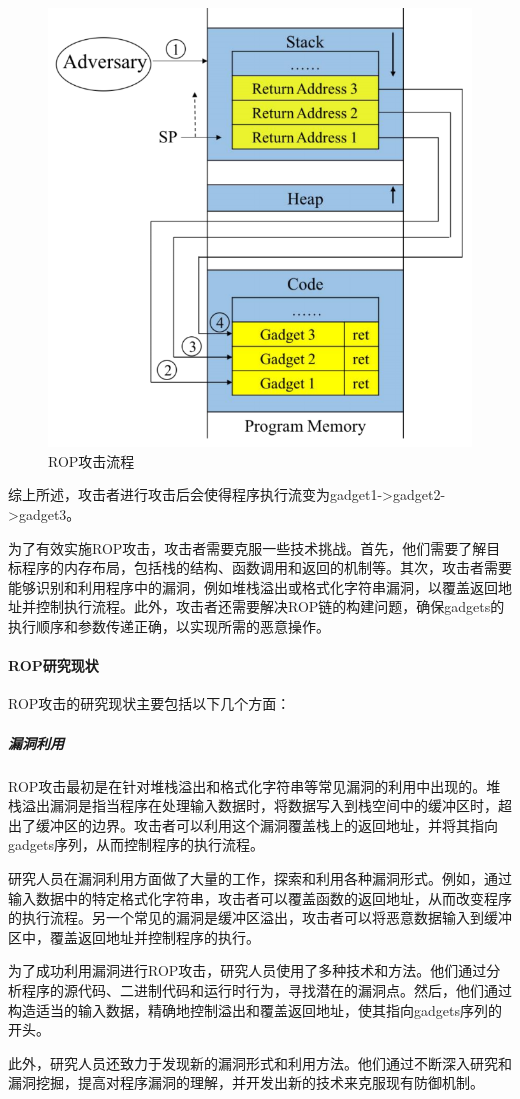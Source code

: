 \documentclass[12pt,a4paper]{ctexart}
\numberwithin{figure}{section}
\begin{document}
\begin{figure}
    \centering
    \includegraphics[scale=0.35]{graph/ROP.png}
    \caption{ROP攻击流程}
    \label{ROP}
\end{figure}
综上所述，攻击者进行攻击后会使得程序执行流变为gadget1->gadget2->gadget3。

\par 为了有效实施ROP攻击，攻击者需要克服一些技术挑战。首先，他们需要了解目标程序的内存布局，包括栈的结构、函数调用和返回的机制等。其次，攻击者需要能够识别和利用程序中的漏洞，例如堆栈溢出或格式化字符串漏洞，以覆盖返回地址并控制执行流程。此外，攻击者还需要解决ROP链的构建问题，确保gadgets的执行顺序和参数传递正确，以实现所需的恶意操作。

\paragraph{ROP研究现状}
ROP攻击的研究现状主要包括以下几个方面：
\subparagraph{漏洞利用}
\par ROP攻击最初是在针对堆栈溢出和格式化字符串等常见漏洞的利用中出现的。堆栈溢出漏洞是指当程序在处理输入数据时，将数据写入到栈空间中的缓冲区时，超出了缓冲区的边界。攻击者可以利用这个漏洞覆盖栈上的返回地址，并将其指向gadgets序列，从而控制程序的执行流程。
\par 研究人员在漏洞利用方面做了大量的工作，探索和利用各种漏洞形式。例如，通过输入数据中的特定格式化字符串，攻击者可以覆盖函数的返回地址，从而改变程序的执行流程。另一个常见的漏洞是缓冲区溢出，攻击者可以将恶意数据输入到缓冲区中，覆盖返回地址并控制程序的执行。
\par 为了成功利用漏洞进行ROP攻击，研究人员使用了多种技术和方法。他们通过分析程序的源代码、二进制代码和运行时行为，寻找潜在的漏洞点。然后，他们通过构造适当的输入数据，精确地控制溢出和覆盖返回地址，使其指向gadgets序列的开头。
\par 此外，研究人员还致力于发现新的漏洞形式和利用方法。他们通过不断深入研究和漏洞挖掘，提高对程序漏洞的理解，并开发出新的技术来克服现有防御机制。
\end{document}
